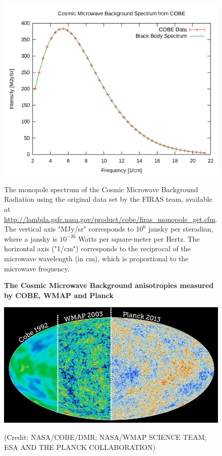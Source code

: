 \documentclass{article}
\begin{document}
\begin{figure}[h]
\centering
\centering
   {\includegraphics[height=9cm]{blackbody}}
\caption{The monopole spectrum of the Cosmic Microwave Background Radiation using the original data set by the FIRAS team, available at \url{http://lambda.gsfc.nasa.gov/product/cobe/firas_monopole_get.cfm}. The vertical axis "MJy/sr" corresponds to $10^6$ jansky per steradian, where a jansky is $10^{-26}$ Watts per square-meter per Hertz. The horizontal axis ("1/cm") corresponds to the reciprocal of the microwave wavelength (in cm), which is proportional to the microwave frequency.}
\label{cobe_blackbody}
\end{figure}


\begin{figure}[h]
\centering
    \textbf{The Cosmic Microwave Background anisotropies measured by COBE, WMAP and Planck}\par\medskip
\centering
   {\includegraphics[width=.65\textwidth]{cmb1.jpg}}


\caption{(Credit: NASA/COBE/DMR; NASA/WMAP SCIENCE TEAM; ESA AND THE PLANCK COLLABORATION)}
\label{cobe_wmap_planck}
\end{figure}
\end{document}
